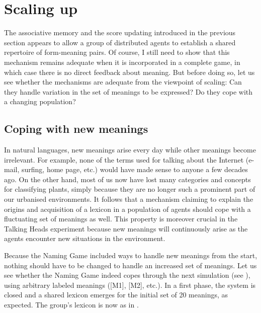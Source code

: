 \section{Scaling up} 

The associative memory and the score updating introduced
in the previous section appears to allow a group of 
distributed agents to establish a shared repertoire of
form-meaning pairs. Of course, I still need to show that 
this mechanism remains adequate when it is incorporated
in a complete game, in which case there is no direct feedback 
about meaning. But before doing so, let us see whether 
the mechanisms are adequate from the viewpoint of scaling: 
Can they handle variation in the set of meanings to 
be expressed? Do they cope with a changing population? 

\subsection{Coping with new meanings}

In natural languages, new meanings arise every day 
while other meanings become irrelevant. 
For example, none of the terms used for talking about
the Internet (e-mail,
surfing, home page, etc.) would have made sense to anyone
a few decades ago. On the other hand, most of us now have lost 
many categories and concepts for classifying plants, 
simply because they are no longer such a prominent part of our 
urbanised environments. It follows that a mechanism 
claiming to explain the origins and acquisition 
of a lexicon in a population
of agents should cope with a fluctuating set of meanings
as well. This property is moreover crucial in the Talking 
Heads experiment because new meanings will continuously 
arise as the agents encounter new situations in 
the environment. 

Because the Naming Game included ways to 
handle new meanings from the start, nothing should 
have to be changed to handle an increased set of meanings. 
Let us see whether the Naming Game indeed copes
through the next simulation (see ), using 
arbitrary labeled meanings ([M1], [M2], etc.). 
In a first phase, the system is closed 
and a shared lexicon emerges for the initial set 
of 20 meanings, as expected. The group's lexicon
is now as in . 


